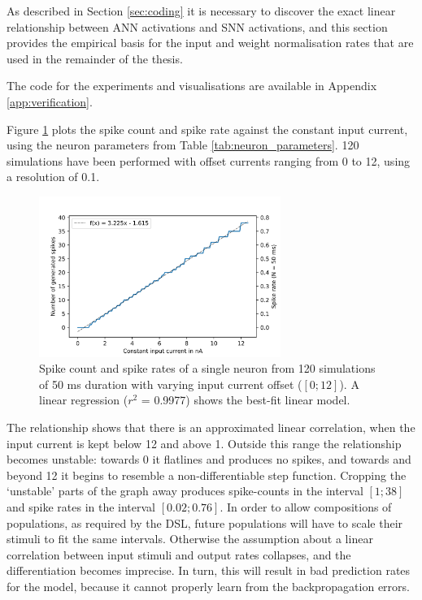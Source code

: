 
As described in Section \ref{sec:coding} it is necessary to discover the exact
linear relationship between \gls{ANN} activations and \gls{SNN} activations, and
this section provides the empirical basis for the input and weight normalisation
rates that are used in the remainder of the thesis.

The code for the experiments and visualisations are available in Appendix
\ref{app:verification}.

Figure \ref{fig:spike_rates} plots the spike count and spike rate against the
constant input current, using the neuron parameters from Table \ref{tab:neuron_parameters}.
120 simulations have been performed with offset currents ranging from 0 to 12, 
using a resolution of 0.1.

\begin{figure}
  \centering
  \includegraphics[width=0.7\textwidth]{images/spike_rate.png}
  \caption{Spike count and spike rates of a single neuron from 120 simulations of 50 ms
    duration with varying input current offset ($[0;12]$).
  A linear regression ($r^2$ = 0.9977) shows the best-fit linear model.}
  \label{fig:spike_rates}
\end{figure}

The relationship shows that there is an approximated linear correlation, when the
input current is kept below 12 and above 1. 
Outside this range the relationship becomes unstable: towards 0 it flatlines and
produces no spikes, and towards and beyond 12 it begins to resemble a non-differentiable 
step function.
Cropping the `unstable' parts of the graph away produces spike-counts in the interval
$[1;38]$ and spike rates in the interval $[0.02;0.76]$.
In order to allow compositions of populations, as required by the \gls{DSL},
future populations will have to scale their stimuli to fit the same intervals.
Otherwise the assumption about a linear correlation between input stimuli and
output rates collapses, and the differentiation becomes imprecise.
In turn, this will result in bad prediction rates for the model, because it
cannot properly learn from the backpropagation errors.

